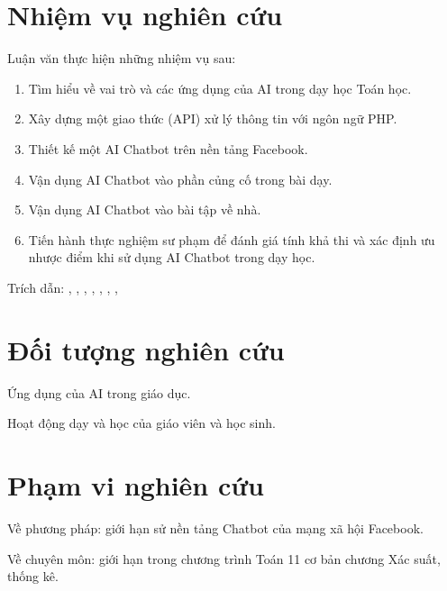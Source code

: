 \section{Nhiệm vụ nghiên cứu}
Luận văn thực hiện những nhiệm vụ sau:\par
\begin{enumerate}[label=\textbf{\thesection.\arabic*.},align=left,left=0cm..1cm]
	\item Tìm hiểu về vai trò và các ứng dụng của AI trong dạy học Toán học.
	\item Xây dựng một giao thức (API) xử lý thông tin với ngôn ngữ PHP.
	\item Thiết kế một AI Chatbot trên nền tảng Facebook.
	\item Vận dụng AI Chatbot vào phần củng cố trong bài dạy.
	\item Vận dụng AI Chatbot vào bài tập về nhà.
	\item Tiến hành thực nghiệm sư phạm để đánh giá tính khả thi và xác định ưu nhược điểm khi sử dụng AI Chatbot trong dạy học.
\end{enumerate}\par
Trích dẫn: \cite{gadanidis2017artificial}, \cite{sheromova2020learning}, \cite{themistokleous2020mobile}, \cite{martin2017virtual}, \cite{bii2013chatbot}, \cite{hoang2011ung}, \cite{hsu2012mobile}, \cite{abueloun2017mathematics} \cite{devedvzic2004web}\par

\section{Đối tượng nghiên cứu}
Ứng dụng của AI trong giáo dục.\par
Hoạt động dạy và học của giáo viên và học sinh.\par

\section{Phạm vi nghiên cứu}
Về phương pháp: giới hạn sử nền tảng Chatbot của mạng xã hội Facebook.\par
Về chuyên môn: giới hạn trong chương trình Toán 11 cơ bản chương Xác suất, thống kê.\par

